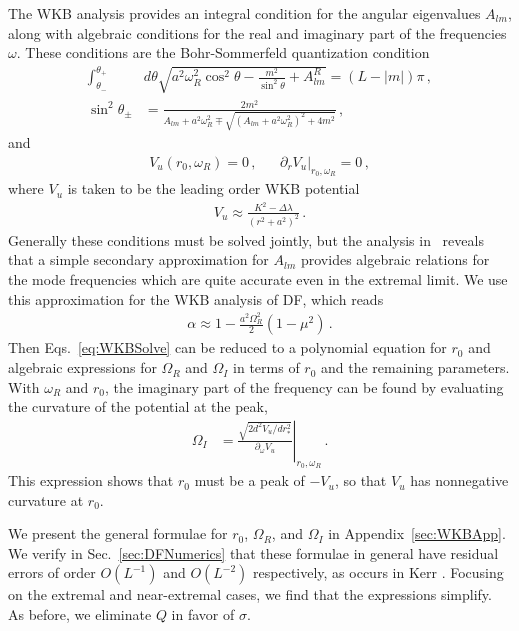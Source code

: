 \begin{refsection}
The WKB analysis provides an integral condition for the angular eigenvalues $A_{lm}$, along with algebraic conditions for the real and imaginary part of the frequencies $\omega$. These conditions are the Bohr-Sommerfeld quantization condition
\begin{align}
\int_{\theta_-}^{\theta_+}&d\theta\sqrt{a^2\omega_R^2\cos^2\theta-\frac{m^2}{\sin^2\theta}+A^R_{l m}}=(L-|m|)\pi \,, \\
\sin^2 \theta_\pm &=\frac{2m^2}{A_{l m}+a^2 \omega^{2}_{R}\mp\sqrt{(A_{l m}+a^2 \omega^2_{R})^2+4m^2}} \,,
\end{align}
and
\begin{align}
\label{eq:WKBSolve}
V_u(r_0, \omega_R) = 0\,, & & \left. \partial_r V_u \right|_{r_0,\omega_R} = 0 \,,
\end{align}
where $V_u$ is taken to be the leading order WKB potential
\begin{align}
V_u \approx \frac{K^2 - \Delta \lambda}{(r^2 +a^2)^2} \,.
\end{align}
Generally these conditions must be solved jointly, but the analysis in~\cite{Yang:2012he} reveals that a simple secondary approximation for $A_{lm}$ provides algebraic relations for the mode frequencies which are quite accurate even in the extremal limit. We use this approximation for the WKB analysis of DF, which reads
\begin{align}
\label{eq:AppxA}
\alpha \approx 1 - \frac{a^2 \Omega_R^2}{2}\left( 1- \mu^2 \right) \,.
\end{align}
Then Eqs.~\eqref{eq:WKBSolve} can be reduced to a polynomial equation for $r_0$ and algebraic expressions for $\Omega_R$ and $\Omega_I$ in terms of $r_0$ and the remaining parameters. With $\omega_R$ and $r_0$, the imaginary part of the frequency can be found by evaluating the curvature of the potential at the peak,
\begin{align}
\label{eq:WKBOmegaI}
\Omega_I & = \left. \frac{\sqrt{2 d^2 V_u/dr_*^2 }}{\partial_\omega V_u }\right|_{r_0,\omega_R} \,.
\end{align}
This expression shows that $r_0$ must be a peak of $-V_u$, so that $V_u$ has nonnegative curvature at $r_0$. 

We present the general formulae for $r_0$, $\Omega_R$, and $\Omega_I$ in Appendix~\ref{sec:WKBApp}. We verify in Sec.~\ref{sec:DFNumerics} that these formulae in general have residual errors of order $O(L^{-1})$ and $O(L^{-2})$ respectively, as occurs in Kerr \cite{Yang:2012he}.
Focusing on the extremal and near-extremal cases, we find that the expressions simplify.
As before, we eliminate $Q$ in favor of $\sigma$.



\end{refsection}
